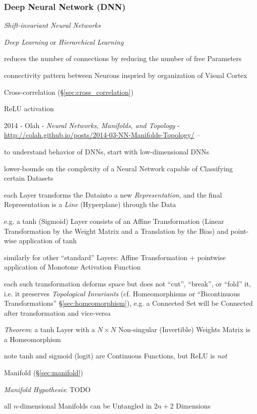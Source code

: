 \subsubsection{Deep Neural Network (DNN)}\label{sec:dnn}

\emph{Shift-invariant Neural Networks}

\emph{Deep Learning} or \emph{Hierarchical Learning}

reduces the number of connections by reducing the number of free Parameters

connectivity pattern between Neurons inspried by organization of Visual Cortex

Cross-correlation (\S\ref{sec:cross_correlation})

ReLU activation

\asterism

2014 - Olah - \emph{Neural Networks, Manifolds, and Topology} -
\url{http://colah.github.io/posts/2014-03-NN-Manifolds-Topology/} --

to understand behavior of DNNs, start with low-dimensional DNNs

lower-bounds on the complexity of a Neural Network capable of Classifying
certain Datasets

each Layer transforms the Datainto a new \emph{Representation}, and the
final Representation is a \emph{Line} (Hyperplane) through the Data

e.g. a tanh (Sigmoid) Layer consists of an Affine Transformation (Linear
Transformation by the Weight Matrix and a Translation by the Bias) and
point-wise application of tanh

similarly for other ``standard'' Layers: Affine Transformation + pointwise
application of Monotone Activation Function

each such transformation deforms space but does not ``cut'', ``break'', or
``fold'' it, i.e. it preserves \emph{Topological Invariants} (cf. Homeomorphisms
or ``Bicontinuous Transformations'' \S\ref{sec:homeomorphism}), e.g. a Connected
Set will be Connected after transformation and vice-versa

\emph{Theorem}: a tanh Layer with a $N \times N$ Non-singular (Invertible)
Weights Matrix is a Homeomorphism

note tanh and sigmoid (logit) are Continuous Functions, but ReLU is \emph{not}

Manifold (\S\ref{sec:manifold})

\emph{Manifold Hypothesis}: TODO

all $n$-dimensional Manifolds can be Untangled in $2n + 2$ Dimensions

